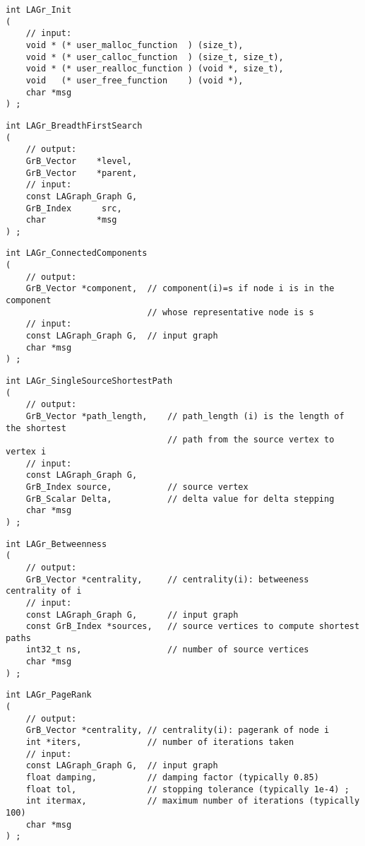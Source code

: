 \begin{verbatim}
int LAGr_Init
(
    // input:
    void * (* user_malloc_function  ) (size_t),
    void * (* user_calloc_function  ) (size_t, size_t),
    void * (* user_realloc_function ) (void *, size_t),
    void   (* user_free_function    ) (void *),
    char *msg
) ;
\end{verbatim}




\begin{verbatim}
int LAGr_BreadthFirstSearch
(
    // output:
    GrB_Vector    *level,
    GrB_Vector    *parent,
    // input:
    const LAGraph_Graph G,
    GrB_Index      src,
    char          *msg
) ;
\end{verbatim}




\begin{verbatim}
int LAGr_ConnectedComponents
(
    // output:
    GrB_Vector *component,  // component(i)=s if node i is in the component
                            // whose representative node is s
    // input:
    const LAGraph_Graph G,  // input graph
    char *msg
) ;
\end{verbatim}




\begin{verbatim}
int LAGr_SingleSourceShortestPath
(
    // output:
    GrB_Vector *path_length,    // path_length (i) is the length of the shortest
                                // path from the source vertex to vertex i
    // input:
    const LAGraph_Graph G,
    GrB_Index source,           // source vertex
    GrB_Scalar Delta,           // delta value for delta stepping
    char *msg
) ;
\end{verbatim}




\begin{verbatim}
int LAGr_Betweenness
(
    // output:
    GrB_Vector *centrality,     // centrality(i): betweeness centrality of i
    // input:
    const LAGraph_Graph G,      // input graph
    const GrB_Index *sources,   // source vertices to compute shortest paths
    int32_t ns,                 // number of source vertices
    char *msg
) ;
\end{verbatim}




\begin{verbatim}
int LAGr_PageRank
(
    // output:
    GrB_Vector *centrality, // centrality(i): pagerank of node i
    int *iters,             // number of iterations taken
    // input:
    const LAGraph_Graph G,  // input graph
    float damping,          // damping factor (typically 0.85)
    float tol,              // stopping tolerance (typically 1e-4) ;
    int itermax,            // maximum number of iterations (typically 100)
    char *msg
) ;
\end{verbatim}




